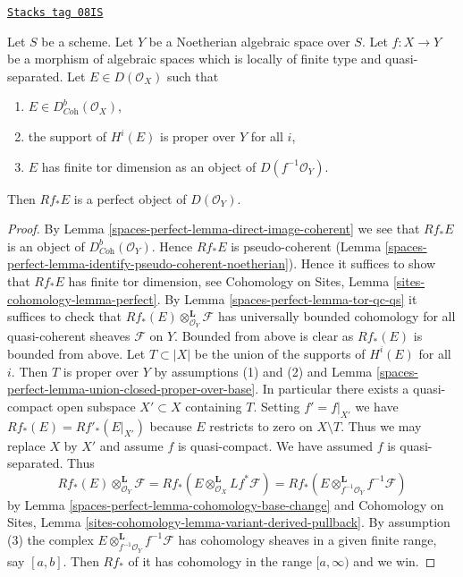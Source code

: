 \begin{lemma}
\label{spaces-perfect-lemma-perfect-direct-image}
\href{https://stacks.math.columbia.edu/tag/08IS}{\texttt{Stacks tag 08IS}}

Let $S$ be a scheme. Let $Y$ be a Noetherian algebraic space over $S$.
Let $f : X \to Y$ be a morphism of algebraic spaces which is locally of
finite type and quasi-separated. Let $E \in D(\mathcal{O}_X)$ such that
\begin{enumerate}
\item $E \in D^b_{\textit{Coh}}(\mathcal{O}_X)$,
\item the support of $H^i(E)$ is proper over $Y$ for all $i$,
\item $E$ has finite tor dimension as an object of $D(f^{-1}\mathcal{O}_Y)$.
\end{enumerate}
Then $Rf_*E$ is a perfect object of $D(\mathcal{O}_Y)$.
\end{lemma}

\begin{proof}
By Lemma \ref{spaces-perfect-lemma-direct-image-coherent} we see that $Rf_*E$ is an object of
$D^b_{\textit{Coh}}(\mathcal{O}_Y)$. Hence $Rf_*E$ is pseudo-coherent
(Lemma \ref{spaces-perfect-lemma-identify-pseudo-coherent-noetherian}).
Hence it suffices to show that $Rf_*E$ has finite tor dimension, see
Cohomology on Sites, Lemma \ref{sites-cohomology-lemma-perfect}.
By Lemma \ref{spaces-perfect-lemma-tor-qc-qs} it suffices to check that
$Rf_*(E) \otimes_{\mathcal{O}_Y}^\mathbf{L} \mathcal{F}$
has universally bounded cohomology for all quasi-coherent
sheaves $\mathcal{F}$ on $Y$. Bounded from above is clear as $Rf_*(E)$
is bounded from above. Let $T \subset |X|$ be the union of the supports
of $H^i(E)$ for all $i$. Then $T$ is proper over $Y$ by assumptions (1)
and (2) and Lemma \ref{spaces-perfect-lemma-union-closed-proper-over-base}.
In particular there exists a quasi-compact open subspace
$X' \subset X$ containing $T$. Setting $f' = f|_{X'}$ we have
$Rf_*(E) = Rf'_*(E|_{X'})$ because $E$ restricts to zero on $X \setminus T$.
Thus we may replace $X$ by $X'$ and assume $f$ is quasi-compact.
We have assumed $f$ is quasi-separated. Thus
$$
Rf_*(E) \otimes_{\mathcal{O}_Y}^\mathbf{L} \mathcal{F} =
Rf_*\left(E \otimes_{\mathcal{O}_X}^\mathbf{L} Lf^*\mathcal{F}\right) =
Rf_*\left(E \otimes_{f^{-1}\mathcal{O}_Y}^\mathbf{L} f^{-1}\mathcal{F}\right)
$$
by
Lemma \ref{spaces-perfect-lemma-cohomology-base-change}
and
Cohomology on Sites, Lemma
\ref{sites-cohomology-lemma-variant-derived-pullback}.
By assumption (3) the complex
$E \otimes_{f^{-1}\mathcal{O}_Y}^\mathbf{L} f^{-1}\mathcal{F}$
has cohomology sheaves in a
given finite range, say $[a, b]$. Then $Rf_*$ of it
has cohomology in the range $[a, \infty)$ and we win.
\end{proof}

